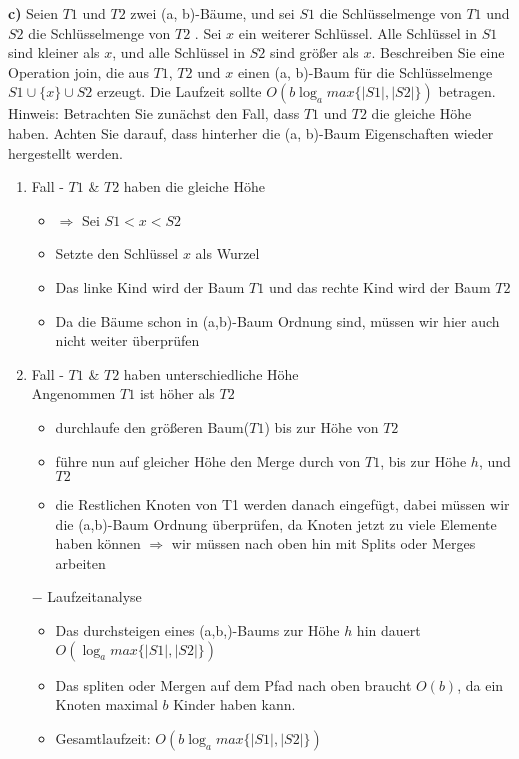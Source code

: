 	

\newpage
\noindent
\textbf{c)} Seien $T1$ und $T2$ zwei (a, b)-Bäume, und sei $S1$ die Schlüsselmenge von $T1$ und $S2$ die Schlüsselmenge von $T2$ . Sei $x$ ein weiterer Schlüssel. Alle Schlüssel in $S1$ sind kleiner als $x$, und alle Schlüssel in $S2$ sind größer als $x$. Beschreiben Sie eine Operation join, die aus $T1$, $T2$ und $x$ einen (a, b)-Baum für die Schlüsselmenge $S1 \cup \{x\} \cup S2$ erzeugt. Die Laufzeit sollte $O(b \log_{a} max\{|S1|, |S2|\})$ betragen. Hinweis: Betrachten Sie zunächst den Fall, dass $T1$ und $T2$ die gleiche Höhe haben. Achten Sie darauf, dass hinterher die (a, b)-Baum Eigenschaften wieder hergestellt werden.\\

\begin{enumerate}
\item Fall - $T1$ \& $T2$ haben die gleiche Höhe
	\begin{itemize}
	\item $\Rightarrow$ Sei $S1 < x < S2$
	\item Setzte den Schlüssel $x$ als Wurzel
	\item Das linke Kind wird der Baum $T1$ und das rechte Kind wird der Baum $T2$
	\item Da die Bäume schon in (a,b)-Baum Ordnung sind, müssen wir hier auch nicht weiter überprüfen 
	\end{itemize}


\item Fall - $T1$ \& $T2$ haben unterschiedliche Höhe\\
Angenommen $T1$ ist höher als $T2$
\begin{itemize}
	\item durchlaufe den größeren Baum($T1$) bis zur Höhe von $T2$
	\item führe nun auf gleicher Höhe den Merge durch von $T1$, bis zur Höhe $h$, und $T2$ 
	\item die Restlichen Knoten von T1 werden danach eingefügt, dabei müssen wir die (a,b)-Baum Ordnung überprüfen, da Knoten jetzt zu viele Elemente haben können $\Rightarrow$ wir müssen nach oben hin mit Splits oder Merges arbeiten
\end{itemize}

\item[$-$] Laufzeitanalyse
\begin{itemize}
	\item Das durchsteigen eines (a,b,)-Baums zur Höhe $h$ hin dauert $O(\log_{a} max\{|S1|, |S2|\})$
	\item Das spliten oder Mergen auf dem Pfad nach oben braucht $O(b)$, da ein Knoten maximal $b$ Kinder haben kann.
	\item Gesamtlaufzeit: $O(b \log_{a} max\{|S1|, |S2|\})$
\end{itemize}

\end{enumerate}